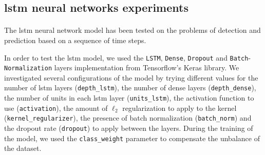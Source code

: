 \subsection{\acs{lstm} neural networks experiments}
\paragraph{} The \acs{lstm} neural network model has been tested on the problems of detection and prediction based on a sequence of time steps.

In order to test the \acs{lstm} model, we used the \texttt{LSTM}, \texttt{Dense}, \texttt{Dropout} and \texttt{Batch}-\texttt{Normalization} layers implementation from Tensorflow's Keras library. We investigated several configurations of the model by trying different values for the number of \acs{lstm} layers (\texttt{depth\_lstm}), the number of dense layers (\texttt{depth\_dense}), the number of units in each \acs{lstm} layer (\texttt{units\_lstm}), the activation function to use (\texttt{activation}), the amount of $\ell_2$ regularization to apply to the kernel (\texttt{kernel\_regularizer}), the presence of batch normalization (\texttt{batch\_norm}) and the dropout rate (\texttt{dropout}) to apply between the layers. During the training of the model, we used the \texttt{class\_weight} parameter to compensate the unbalance of the dataset.

